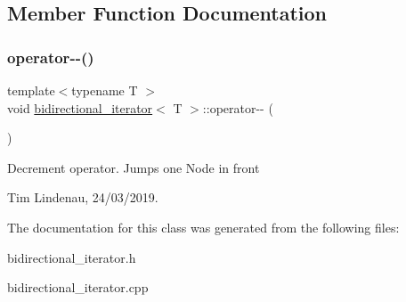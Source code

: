 \subsection{Member Function Documentation}
\mbox{\label{classbidirectional__iterator_a1d3d0fc56cc4598e4566ff528a88e5f1}} 
\subsubsection{\texorpdfstring{operator-\/-\/()}{operator--()}}
{\footnotesize\ttfamily template$<$typename T $>$ \\
void \mbox{\hyperlink{classbidirectional__iterator}{bidirectional\+\_\+iterator}}$<$ T $>$\+::operator-\/-\/ (\begin{DoxyParamCaption}{ }\end{DoxyParamCaption})}



Decrement operator. Jumps one Node in front 

Tim Lindenau, 24/03/2019. 

The documentation for this class was generated from the following files\+:\begin{DoxyCompactItemize}
\item 
bidirectional\+\_\+iterator.\+h\item 
bidirectional\+\_\+iterator.\+cpp\end{DoxyCompactItemize}
